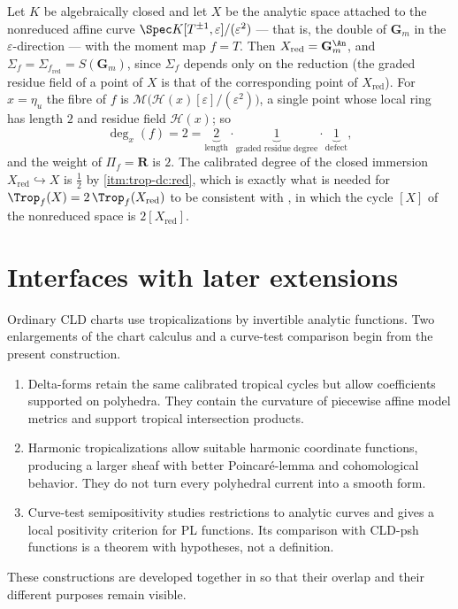 \begin{example}
\label{ex:trop-length-factor}
Let $K$ be algebraically closed and let $X$ be the analytic space attached to
the nonreduced affine curve $\Spec K[T^{\pm1},\varepsilon]/(\varepsilon^2)$
--- that is, the double of $\mathbf G_m$ in the $\varepsilon$-direction ---
with the moment map $f=T$. Then $X_{\mathrm{red}}=\mathbf G_m^{\An}$, and
$\Sigma_f=\Sigma_{f_{\mathrm{red}}}=S(\mathbf G_m)$, since $\Sigma_f$ depends
only on the reduction (the graded residue field of a point of $X$ is that of
the corresponding point of $X_{\mathrm{red}}$). For $x=\eta_u$ the fibre of
$f$ is $\mathcal M\bigl(\mathcal H(x)[\varepsilon]/(\varepsilon^2)\bigr)$,
a single point whose local ring has length $2$ and residue field
$\mathcal H(x)$; so
\[
 \deg_x(f)=2=\underbrace{2}_{\text{length}}\cdot
 \underbrace{1}_{\text{graded residue degree}}\cdot
 \underbrace{1}_{\text{defect}},
\]
and the weight of $\Pi_f=\mathbf R$ is $2$. The calibrated degree of the
closed immersion $X_{\mathrm{red}}\hookrightarrow X$ is
$\tfrac12$ by  \cref{itm:trop-dc:red},
which is exactly what is needed for
$\Trop_f(X)=2\,\Trop_f(X_{\mathrm{red}})$ to be consistent with
, in which the cycle $[X]$ of the
nonreduced space is $2[X_{\mathrm{red}}]$.
\end{example}

\section{Interfaces with later extensions}

Ordinary CLD charts use tropicalizations by invertible analytic functions.
Two enlargements of the chart calculus and a curve-test comparison begin
from the present construction.
\begin{enumerate}
\item Delta-forms retain the same calibrated tropical cycles but allow
  coefficients supported on polyhedra. They contain the curvature of
  piecewise affine model metrics and support tropical intersection products.
\item Harmonic tropicalizations allow suitable harmonic coordinate functions,
  producing a larger sheaf with better Poincaré-lemma and cohomological
  behavior. They do not turn every polyhedral current into a smooth form.
\item Curve-test semipositivity studies restrictions to analytic curves and
  gives a local positivity criterion for PL functions. Its comparison with
  CLD-psh functions is a theorem with hypotheses, not a definition.
\end{enumerate}
These constructions are developed together in  so that their
overlap and their different purposes remain visible.

